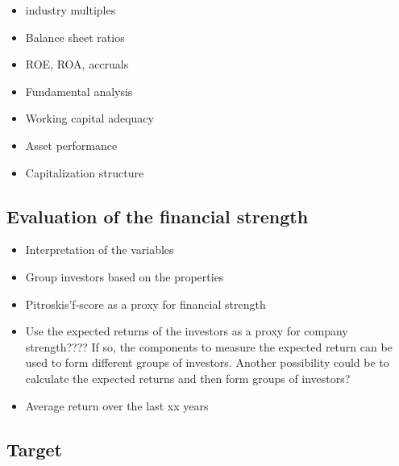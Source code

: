 \documentclass[12pt]{article}
\begin{document}
    \begin{itemize}

        \item industry multiples
        \item Balance sheet ratios
        \item ROE, ROA, accruals 
        \item Fundamental analysis
        \item Working capital adequacy
        \item Asset performance
        \item Capitalization structure

    \end{itemize}
    
\subsection{Evaluation of the financial strength} 
    
    \begin{itemize}

        \item Interpretation of the variables
        \item Group investors based on the properties
        \item Pitroskis'f-score as a proxy for financial strength
        \item Use the expected returns of the investors as a proxy for company strength???? If so, the components to measure the expected return can be used to form different groups of investors. Another possibility could be to calculate the expected returns and then form groups of investors? 
        \item Average return over the last xx years 

    \end{itemize}

\subsection{Target}
\end{document}
